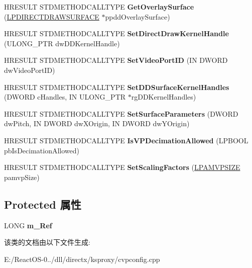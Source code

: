 \begin{DoxyCompactItemize}
H\+R\+E\+S\+U\+LT S\+T\+D\+M\+E\+T\+H\+O\+D\+C\+A\+L\+L\+T\+Y\+PE {\bfseries Get\+Overlay\+Surface} (\hyperlink{interfacevoid}{L\+P\+D\+I\+R\+E\+C\+T\+D\+R\+A\+W\+S\+U\+R\+F\+A\+CE} $\ast$ppdd\+Overlay\+Surface)
\item 
\mbox{\label{class_c_v_p_config_a17c4968de1fbd13706e4b9414f3fe9c5}} 
H\+R\+E\+S\+U\+LT S\+T\+D\+M\+E\+T\+H\+O\+D\+C\+A\+L\+L\+T\+Y\+PE {\bfseries Set\+Direct\+Draw\+Kernel\+Handle} (U\+L\+O\+N\+G\+\_\+\+P\+TR dw\+D\+D\+Kernel\+Handle)
\item 
\mbox{\label{class_c_v_p_config_acc37f59229d5078568bc7fe7b9944a5b}} 
H\+R\+E\+S\+U\+LT S\+T\+D\+M\+E\+T\+H\+O\+D\+C\+A\+L\+L\+T\+Y\+PE {\bfseries Set\+Video\+Port\+ID} (IN D\+W\+O\+RD dw\+Video\+Port\+ID)
\item 
\mbox{\label{class_c_v_p_config_a763e2bb0ef7be054c2e458bdc2184785}} 
H\+R\+E\+S\+U\+LT S\+T\+D\+M\+E\+T\+H\+O\+D\+C\+A\+L\+L\+T\+Y\+PE {\bfseries Set\+D\+D\+Surface\+Kernel\+Handles} (D\+W\+O\+RD c\+Handles, IN U\+L\+O\+N\+G\+\_\+\+P\+TR $\ast$rg\+D\+D\+Kernel\+Handles)
\item 
\mbox{\label{class_c_v_p_config_ac26e40a8d814757af45ca170a3f8e606}} 
H\+R\+E\+S\+U\+LT S\+T\+D\+M\+E\+T\+H\+O\+D\+C\+A\+L\+L\+T\+Y\+PE {\bfseries Set\+Surface\+Parameters} (D\+W\+O\+RD dw\+Pitch, IN D\+W\+O\+RD dw\+X\+Origin, IN D\+W\+O\+RD dw\+Y\+Origin)
\item 
\mbox{\label{class_c_v_p_config_a822463a6bed4de3d799c771e12c8dd5e}} 
H\+R\+E\+S\+U\+LT S\+T\+D\+M\+E\+T\+H\+O\+D\+C\+A\+L\+L\+T\+Y\+PE {\bfseries Is\+V\+P\+Decimation\+Allowed} (L\+P\+B\+O\+OL pb\+Is\+Decimation\+Allowed)
\item 
\mbox{\label{class_c_v_p_config_ae2d50c138b89b009e47a8155a08bf5d1}} 
H\+R\+E\+S\+U\+LT S\+T\+D\+M\+E\+T\+H\+O\+D\+C\+A\+L\+L\+T\+Y\+PE {\bfseries Set\+Scaling\+Factors} (\hyperlink{struct___a_m_v_p_s_i_z_e}{L\+P\+A\+M\+V\+P\+S\+I\+ZE} pamvp\+Size)
\end{DoxyCompactItemize}
\subsection*{Protected 属性}
\begin{DoxyCompactItemize}
\item 
\mbox{\label{class_c_v_p_config_a31d975ffec471f9878e3adca8e8c9e9e}} 
L\+O\+NG {\bfseries m\+\_\+\+Ref}
\end{DoxyCompactItemize}


该类的文档由以下文件生成\+:\begin{DoxyCompactItemize}
\item 
E\+:/\+React\+O\+S-\/0../dll/directx/ksproxy/cvpconfig.\+cpp\end{DoxyCompactItemize}
